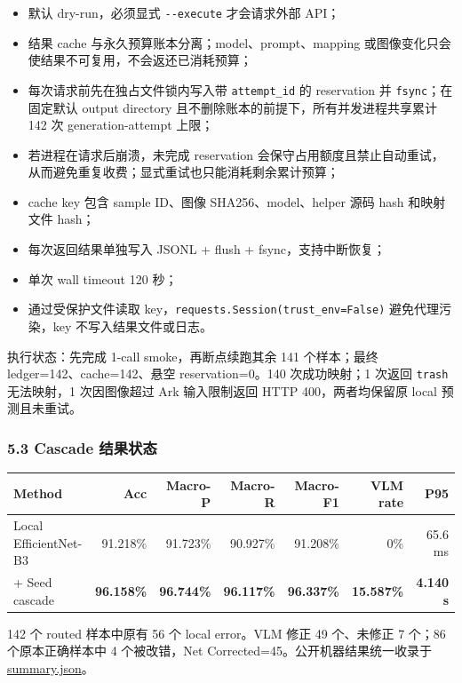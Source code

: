 \documentclass[
  a4paper,
]{article}
\providecommand{\tightlist}{%
  \setlength{\itemsep}{0pt}\setlength{\parskip}{0pt}}
\begin{document}
\begin{itemize}
\tightlist
\item
  默认 dry-run，必须显式 \texttt{-\/-execute} 才会请求外部 API；
\item
  结果 cache 与永久预算账本分离；model、prompt、mapping
  或图像变化只会使结果不可复用，不会返还已消耗预算；
\item
  每次请求前先在独占文件锁内写入带 \texttt{attempt\_id} 的 reservation
  并 \texttt{fsync}；在固定默认 output directory
  且不删除账本的前提下，所有并发进程共享累计 142 次 generation-attempt
  上限；
\item
  若进程在请求后崩溃，未完成 reservation
  会保守占用额度且禁止自动重试，从而避免重复收费；显式重试也只能消耗剩余累计预算；
\item
  cache key 包含 sample ID、图像 SHA256、model、helper 源码 hash
  和映射文件 hash；
\item
  每次返回结果单独写入 JSONL + flush + fsync，支持中断恢复；
\item
  单次 wall timeout 120 秒；
\item
  通过受保护文件读取 key，\texttt{requests.Session(trust\_env=False)}
  避免代理污染，key 不写入结果文件或日志。
\end{itemize}

执行状态：先完成 1-call smoke，再断点续跑其余 141 个样本；最终
ledger=142、cache=142、悬空 reservation=0。140 次成功映射；1 次返回
\texttt{trash} 无法映射，1 次因图像超过 Ark 输入限制返回 HTTP
400，两者均保留原 local 预测且未重试。

\hypertarget{53-cascade-ux7ed3ux679cux72b6ux6001}{%
\subsubsection{5.3 Cascade
结果状态}\label{53-cascade-ux7ed3ux679cux72b6ux6001}}

\begingroup
\small
\setlength{\tabcolsep}{3pt}
\begin{longtable}[]{@{}lrrrrrr@{}}
\toprule
Method & Acc & Macro-P & Macro-R & Macro-F1 & VLM rate & P95 \\
\midrule
\endhead
Local EfficientNet-B3 & 91.218\% & 91.723\% & 90.927\% & 91.208\% & 0\%
& 65.6 ms \\
+ Seed cascade & \textbf{96.158\%} & \textbf{96.744\%} &
\textbf{96.117\%} & \textbf{96.337\%} & \textbf{15.587\%} &
\textbf{4.140 s} \\
\bottomrule
\end{longtable}
\endgroup

142 个 routed 样本中原有 56 个 local error。VLM 修正 49 个、未修正 7
个；86 个原本正确样本中 4 个被改错，Net
Corrected=45。公开机器结果统一收录于
\href{../docs/portfolio/data/summary.json}{summary.json}。
\end{document}
